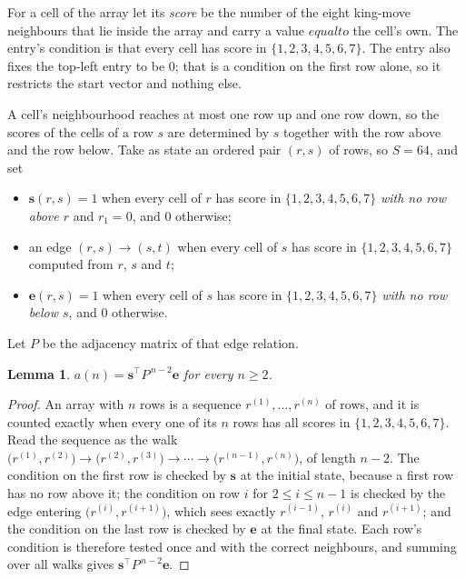 \documentclass[11pt,a4paper]{article}
\theoremstyle{plain}
\newtheorem{lemma}[theorem]{Lemma}
\theoremstyle{definition}
\begin{document}
For a cell of the array let its \emph{score} be the number of the eight king-move neighbours that lie inside
the array and carry a value $equal to$ the cell's own. The entry's condition is that every cell
has score in $\{1,2,3,4,5,6,7\}$. The entry also fixes the top-left entry to be $0$; that is a condition on the first row alone, so it restricts the start vector and nothing else.

A cell's neighbourhood reaches at most one row up and one row down, so the scores of the
cells of a row $s$ are determined by $s$ together with the row above and the row below.
Take as state an ordered pair $(r,s)$ of rows, so $S=64$, and set
\begin{itemize}
\item $\mathbf{s}(r,s)=1$ when every cell of $r$ has score in $\{1,2,3,4,5,6,7\}$ \emph{with no row
above $r$} and $r_1=0$, and $0$ otherwise;
\item an edge $(r,s)\to(s,t)$ when every cell of $s$ has score in $\{1,2,3,4,5,6,7\}$ computed from
$r$, $s$ and $t$;
\item $\mathbf{e}(r,s)=1$ when every cell of $s$ has score in $\{1,2,3,4,5,6,7\}$ \emph{with no row
below $s$}, and $0$ otherwise.
\end{itemize}
Let $P$ be the adjacency matrix of that edge relation.

\begin{lemma}\label{lem:walk}
$a(n)=\mathbf{s}^{\!\top}P^{\,n-2}\mathbf{e}$ for every $n\ge2$.
\end{lemma}

\begin{proof}
An array with $n$ rows is a sequence $r^{(1)},\dots,r^{(n)}$ of rows, and it is counted
exactly when every one of its $n$ rows has all scores in $\{1,2,3,4,5,6,7\}$. Read the sequence as the
walk $\bigl(r^{(1)},r^{(2)}\bigr)\to\bigl(r^{(2)},r^{(3)}\bigr)\to\cdots\to
\bigl(r^{(n-1)},r^{(n)}\bigr)$, of length $n-2$. The condition on the first row is
checked by $\mathbf{s}$ at the initial state, because a first row has no row above it; the
condition on row $i$ for $2\le i\le n-1$ is checked by the edge entering
$\bigl(r^{(i)},r^{(i+1)}\bigr)$, which sees exactly $r^{(i-1)}$, $r^{(i)}$ and
$r^{(i+1)}$; and the condition on the last row is checked by $\mathbf{e}$ at the final
state. Each row's condition is therefore tested once and with the correct neighbours, and
summing over all walks gives $\mathbf{s}^{\!\top}P^{\,n-2}\mathbf{e}$.
\end{proof}
\end{document}
